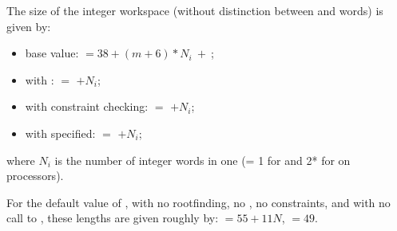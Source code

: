 {{  The size of the integer workspace (without distinction between  
  and  words) is given by:
  \begin{itemize}
  \item base value:  $= 38 + (m + 6)*N_i ~ + ~ $;  
  \item with :  $=$  $+ N_i$;
  \item with constraint checking:  $=$  $+ N_i$;
  \item with  specified:  $=$  $+ N_i$;
  \end{itemize}
  where $N_i$ is the number of integer words in one 
  (= 1 for {\nvecs} and 2* for {\nvecp} on  processors).

  For the default value of , with no rootfinding, no ,
  no constraints, and with no call to , these lengths are
  given roughly by:  $= 55 + 11N$,  $= 49$.

}}
